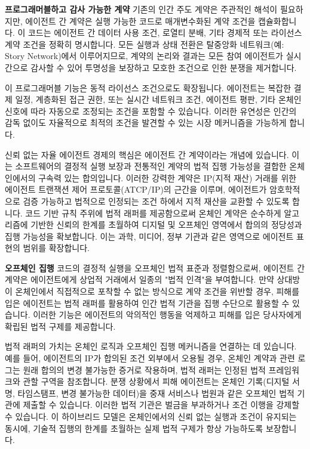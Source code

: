\documentclass[journal,onecolumn]{IEEEtran} %
\begin{document}
\noindent\textbf{프로그래머블하고 감사 가능한 계약}
기존의 인간 주도 계약은 주관적인 해석이 필요하지만, 에이전트 간 계약은 실행 가능한 코드로 매개변수화된 계약 조건을 캡슐화합니다. 이 코드는 에이전트 간 데이터 사용 조건, 로열티 분배, 기타 경제적 또는 라이선스 계약 조건을 정확히 명시합니다. 모든 실행과 상태 전환은 탈중앙화 네트워크(예: Story Network)에서 이루어지므로, 계약의 논리와 결과는 모든 참여 에이전트가 실시간으로 감사할 수 있어 투명성을 보장하고 모호한 조건으로 인한 분쟁을 제거합니다.

이 프로그래머블 기능은 동적 라이선스 조건으로도 확장됩니다. 에이전트는 복잡한 결제 일정, 계층화된 접근 권한, 또는 실시간 네트워크 조건, 에이전트 평판, 기타 온체인 신호에 따라 자동으로 조정되는 조건을 포함할 수 있습니다. 이러한 유연성은 인간의 감독 없이도 자율적으로 최적의 조건을 발견할 수 있는 시장 메커니즘을 가능하게 합니다.

신뢰 없는 자율 에이전트 경제의 핵심은 에이전트 간 계약이라는 개념에 있습니다. 이는 소프트웨어의 결정적 실행 보장과 전통적인 계약의 법적 집행 가능성을 결합한 온체인에서의 구속력 있는 합의입니다. 이러한 강력한 계약은 IP(지적 재산) 거래를 위한 에이전트 트랜잭션 제어 프로토콜(ATCP/IP)의 근간을 이루며, 에이전트가 암호학적으로 검증 가능하고 법적으로 인정되는 조건 하에서 지적 재산을 교환할 수 있도록 합니다. 코드 기반 규칙 주위에 법적 래퍼를 제공함으로써 온체인 계약은 순수하게 알고리즘에 기반한 신뢰의 한계를 초월하여 디지털 및 오프체인 영역에서 합의의 정당성과 집행 가능성을 확보합니다. 이는 과학, 미디어, 정부 기관과 같은 영역으로 에이전트 표현의 범위를 확장합니다.

\noindent\textbf{오프체인 집행}
코드의 결정적 실행을 오프체인 법적 표준과 정렬함으로써, 에이전트 간 계약은 에이전트에게 상업적 거래에서 일종의 "법적 인격"을 부여합니다. 만약 상대방이 온체인에서 직접적으로 포착할 수 없는 방식으로 계약 조건을 위반할 경우, 피해를 입은 에이전트는 법적 래퍼를 활용하여 인간 법적 기관을 집행 수단으로 활용할 수 있습니다. 이러한 기능은 에이전트의 악의적인 행동을 억제하고 피해를 입은 당사자에게 확립된 법적 구제를 제공합니다.

법적 래퍼의 가치는 온체인 로직과 오프체인 집행 메커니즘을 연결하는 데 있습니다. 예를 들어, 에이전트의 IP가 합의된 조건 외부에서 오용될 경우, 온체인 계약과 관련 로그는 원래 합의의 변경 불가능한 증거로 작용하며, 법적 래퍼는 인정된 법적 프레임워크와 관할 구역을 참조합니다. 분쟁 상황에서 피해 에이전트는 온체인 기록(디지털 서명, 타임스탬프, 변경 불가능한 데이터)을 중재 서비스나 법원과 같은 오프체인 법적 기관에 제출할 수 있습니다. 이러한 법적 기관은 벌금을 부과하거나 조건 이행을 강제할 수 있습니다. 이 하이브리드 모델은 온체인에서의 신뢰 없는 실행과 조건이 유지되는 동시에, 기술적 집행의 한계를 초월하는 실제 법적 구제가 항상 가능하도록 보장합니다.
\end{document}
